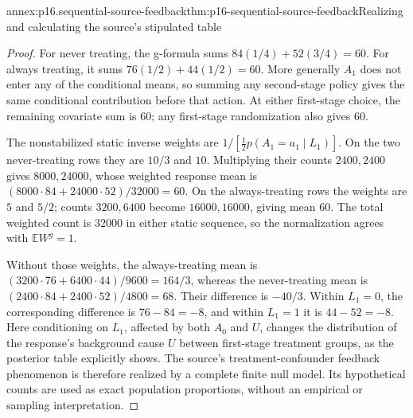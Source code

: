 \begin{annexitem}{annex:p16.sequential-source-feedback}{thm:p16-sequential-source-feedback}{Realizing and calculating the source's stipulated table}
\begin{proof}
For never treating, the g-formula sums \(84(1/4)+52(3/4)=60\).
For always treating, it sums \(76(1/2)+44(1/2)=60\). More generally
\(A_1\) does not enter any of the conditional means, so summing any
second-stage policy gives the same conditional contribution before that
action. At either first-stage choice, the remaining covariate sum is
\(60\); any first-stage randomization also gives \(60\).

The nonstabilized static inverse weights are
\(1/[\frac12 p(A_1=a_1\mid L_1)]\). On the two never-treating rows
they are \(10/3\) and \(10\). Multiplying their counts \(2400,2400\)
gives \(8000,24000\), whose weighted response mean is
\((8000\cdot84+24000\cdot52)/32000=60\).
On the always-treating rows the weights are \(5\) and \(5/2\);
counts \(3200,6400\) become \(16000,16000\), giving mean \(60\).
The total weighted count is \(32000\) in either static sequence,
so the normalization agrees with \(\mathbb E W^g=1\).

Without those weights, the always-treating mean is
\((3200\cdot76+6400\cdot44)/9600=164/3\), whereas the never-treating
mean is \((2400\cdot84+2400\cdot52)/4800=68\). Their difference
is \(-40/3\). Within \(L_1=0\), the corresponding difference is
\(76-84=-8\), and within \(L_1=1\) it is \(44-52=-8\).
Here conditioning on \(L_1\), affected by both \(A_0\) and \(U\),
changes the distribution of the response's background cause \(U\)
between first-stage treatment groups, as the posterior table explicitly
shows. The source's treatment-confounder feedback phenomenon is therefore
realized by a complete finite null model. Its hypothetical counts are
used as exact population proportions, without an empirical or sampling
interpretation.
\end{proof}
\end{annexitem}

